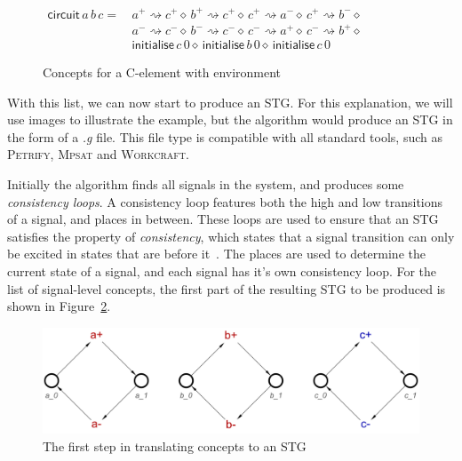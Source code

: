 \documentclass[british,compsoc]{IEEEtran}
\newcommand{\noun}[1]{\textsc{#1}}
\begin{document}
\begin{figure}[h]

\begin{center}

$\begin{aligned}\mathsf{circuit}\,a \,b \,c=& \,a^{+}\rightsquigarrow c^{+} \diamond \,b^{+}\rightsquigarrow c^{+} \diamond \,c^{+}\rightsquigarrow a^{-} \diamond \,c^{+}
\rightsquigarrow b^{-} \diamond \\
&\,a^{-}\rightsquigarrow c^{-} \diamond \,b^{-}\rightsquigarrow c^{-} \diamond \,c^{-}\rightsquigarrow a^{+} \diamond \,c^{-}\rightsquigarrow b^{+} \diamond \\
&\,\mathsf{initialise}\,c \,0 \diamond \,\mathsf{initialise}\,b \,0 \diamond \,\mathsf{initialise}\,c \, 0
\end{aligned}$

\end{center}
\caption{Concepts for a C-element with environment\label{fig:c-element-concepts}}
\end{figure}

With this list, we can now start to produce an STG. For this explanation, we will use images to illustrate the example, but the algorithm would produce an STG in the form of a \emph{.g}
file. This file type is compatible with all standard tools, such as \noun{Petrify}, \noun{Mpsat} and \noun{Workcraft}.

Initially the algorithm finds all signals in the system, and produces some \emph{consistency loops}. A consistency loop features both the high and low transitions of a signal, and places
in between. These loops are used to ensure that an STG satisfies the property of \emph{consistency}, which states that a signal transition can only be excited in states that are before
it~\cite{Cortadella}. The places are used to determine the current state of a signal, and each signal has it's own consistency loop. For the list of signal-level concepts, the first
part of the resulting STG to be produced is shown in Figure~\ref{fig:step-by-step1}.

\begin{figure}[h]
\begin{centering}
\includegraphics[scale=0.23]{Images/Step-by-step1}
\par\end{centering}

\begin{centering}
\protect\caption{\label{fig:step-by-step1}The first step in translating concepts to an STG}

\par\end{centering}

\end{figure}
\end{document}
